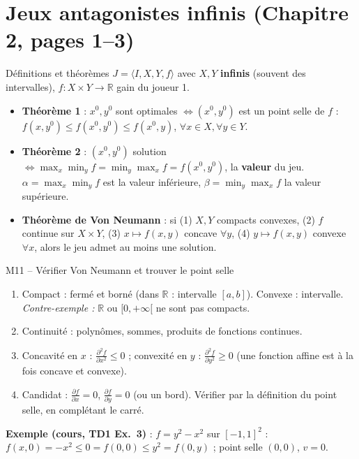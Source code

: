\documentclass[11pt,a4paper]{article}
\begin{document}
\section{Jeux antagonistes infinis (Chapitre 2, pages 1--3)}

\begin{propbox}{Définitions et théorèmes}
$J=\langle I,X,Y,f\rangle$ avec $X,Y$ \textbf{infinis} (souvent des intervalles), $f:X\times Y\to\mathbb{R}$ gain du joueur 1.
\begin{itemize}[leftmargin=*]
\item \textbf{Théorème 1} : $x^0,y^0$ sont optimales $\iff(x^0,y^0)$ est un point selle de $f$ : $f(x,y^0)\le f(x^0,y^0)\le f(x^0,y)$, $\forall x\in X,\forall y\in Y$.
\item \textbf{Théorème 2} : $(x^0,y^0)$ solution $\iff\max_x\min_y f=\min_y\max_x f=f(x^0,y^0)$, la \textbf{valeur} du jeu. $\alpha=\max_x\min_yf$ est la valeur inférieure, $\beta=\min_y\max_xf$ la valeur supérieure.
\item \textbf{Théorème de Von Neumann} : si (1) $X,Y$ compacts convexes, (2) $f$ continue sur $X\times Y$, (3) $x\mapsto f(x,y)$ concave $\forall y$, (4) $y\mapsto f(x,y)$ convexe $\forall x$, alors le jeu admet au moins une solution.
\end{itemize}
\end{propbox}

\begin{methbox}{M11 -- Vérifier Von Neumann et trouver le point selle}
\begin{enumerate}[leftmargin=*]
\item Compact : fermé et borné (dans $\mathbb{R}$ : intervalle $[a,b]$). Convexe : intervalle. \emph{Contre-exemple :} $\mathbb{R}$ ou $[0,+\infty[$ ne sont pas compacts.
\item Continuité : polynômes, sommes, produits de fonctions continues.
\item Concavité en $x$ : $\frac{\partial^2f}{\partial x^2}\le0$ ; convexité en $y$ : $\frac{\partial^2f}{\partial y^2}\ge0$ (une fonction affine est à la fois concave et convexe).
\item Candidat : $\frac{\partial f}{\partial x}=0$, $\frac{\partial f}{\partial y}=0$ (ou un bord). Vérifier par la définition du point selle, en complétant le carré.
\end{enumerate}
\textbf{Exemple (cours, TD1 Ex.~3)} : $f=y^2-x^2$ sur $[-1,1]^2$ : $f(x,0)=-x^2\le0=f(0,0)\le y^2=f(0,y)$ ; point selle $(0,0)$, $v=0$.
\end{methbox}
\end{document}
